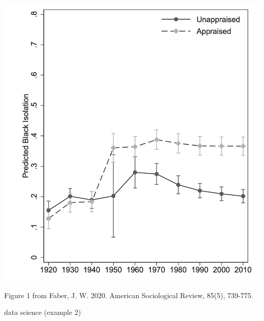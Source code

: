 \documentclass{beamer}
\newcommand\bref[2]{\href{#1}{\color{blue}{#2}}}
\begin{document}
\begin{frame}

\includegraphics[height = .8\textheight]{figures/faber_fig1}

\begin{footnotesize}
Figure 1 from Faber, J. W. 2020. \bref{https://doi.org/10.1177/0003122420948464}{We built this: Consequences of New Deal era intervention in America’s racial geography.} American Sociological Review, 85(5), 739-775.
\end{footnotesize}
\end{frame}

\begin{frame}

\huge data science (example 2)

\end{frame}
\end{document}
